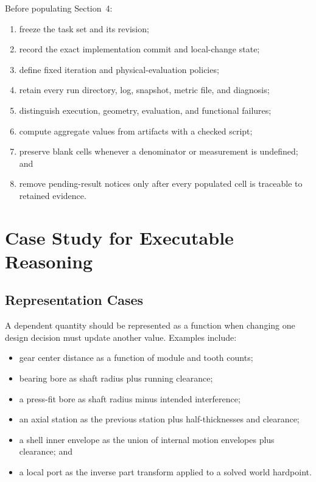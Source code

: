 \documentclass[10pt]{article}
\begin{document}
Before populating Section~4:
\begin{enumerate}[leftmargin=*]
  \item freeze the task set and its revision;
  \item record the exact implementation commit and local-change state;
  \item define fixed iteration and physical-evaluation policies;
  \item retain every run directory, log, snapshot, metric file, and diagnosis;
  \item distinguish execution, geometry, evaluation, and functional failures;
  \item compute aggregate values from artifacts with a checked script;
  \item preserve blank cells whenever a denominator or measurement is undefined; and
  \item remove pending-result notices only after every populated cell is traceable to
        retained evidence.
\end{enumerate}

\section{Case Study for Executable Reasoning}

\subsection{Representation Cases}

A dependent quantity should be represented as a function when changing one design decision
must update another value. Examples include:
\begin{itemize}[leftmargin=*]
  \item gear center distance as a function of module and tooth counts;
  \item bearing bore as shaft radius plus running clearance;
  \item a press-fit bore as shaft radius minus intended interference;
  \item an axial station as the previous station plus half-thicknesses and clearance;
  \item a shell inner envelope as the union of internal motion envelopes plus clearance; and
  \item a local port as the inverse part transform applied to a solved world hardpoint.
\end{itemize}
\end{document}
